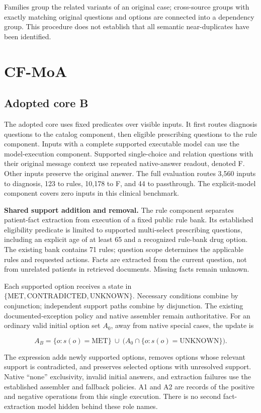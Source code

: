 \documentclass[
  english,
  11pt,
]{article}
\newcounter{none} %
\begin{document}
Families group the related variants of an original case; cross-source
groups with exactly matching original questions and options are
connected into a dependency group. This procedure does not establish
that all semantic near-duplicates have been identified.

\section{CF-MoA}\label{cf-moa}

\subsection{Adopted core B}\label{adopted-core-b}

The adopted core uses fixed predicates over visible inputs. It first
routes diagnosis questions to the catalog component, then eligible
prescribing questions to the rule component. Inputs with a complete
supported executable model can use the model-execution component.
Supported single-choice and relation questions with their original
message context use repeated native-answer readout, denoted F. Other
inputs preserve the original answer. The full evaluation routes 3,560
inputs to diagnosis, 123 to rules, 10,178 to F, and 44 to passthrough.
The explicit-model component covers zero inputs in this clinical
benchmark.

\textbf{Shared support addition and removal.} The rule component
separates patient-fact extraction from execution of a fixed public rule
bank. Its established eligibility predicate is limited to supported
multi-select prescribing questions, including an explicit age of at
least 65 and a recognized rule-bank drug option. The existing bank
contains 71 rules; question scope determines the applicable rules and
requested actions. Facts are extracted from the current question, not
from unrelated patients in retrieved documents. Missing facts remain
unknown.

Each supported option receives a state in
\(\{\mathrm{MET},\mathrm{CONTRADICTED},\mathrm{UNKNOWN}\}\). Necessary
conditions combine by conjunction; independent support paths combine by
disjunction. The existing documented-exception policy and native
assembler remain authoritative. For an ordinary valid initial option set
\(A_0\), away from native special cases, the update is

\[
A_B=\{o:s(o)=\mathrm{MET}\}
\ \cup\ \bigl(A_0\cap\{o:s(o)=\mathrm{UNKNOWN}\}\bigr).
\]

The expression adds newly supported options, removes options whose
relevant support is contradicted, and preserves selected options with
unresolved support. Native ``none'' exclusivity, invalid initial
answers, and extraction failures use the established assembler and
fallback policies. A1 and A2 are records of the positive and negative
operations from this single execution. There is no second
fact-extraction model hidden behind these role names.
\end{document}
